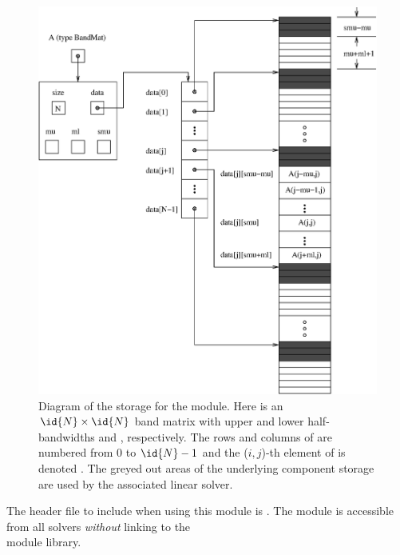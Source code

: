 \begin{figure}
\centerline{\includegraphics[width=4.5 in]{bandmat}}
\caption[Diagram of the storage for a {\sunmatband} object]
  {Diagram of the storage for the {\sunmatband} module. Here  is an
  $\id{N} \times \id{N}$ band matrix with upper and lower half-bandwidths 
  and , respectively. The rows and columns of  are
  numbered from $0$ to $\id{N}-1$ and the ($i,j$)-th element of  is
  denoted . The greyed out areas of the underlying
  component storage are used by the associated {\sunlinsolband}
  linear solver.}\label{f:sunbandmat}
\end{figure}

\noindent The header file to include when using this module 
is . The {\sunmatband} module
is accessible from all {\sundials} solvers \textit{without}
linking to the \\
 module library. \\

